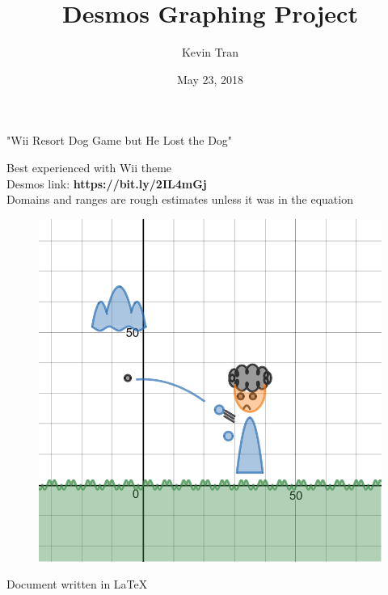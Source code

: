 \documentclass[12pt]{article}
\title{Desmos Graphing Project}
\author{Kevin Tran}
\date{May 23, 2018}
\begin{document}
\maketitle

\clearpage
\begin{center}
\begin{LARGE}
	"Wii Resort Dog Game but He Lost the Dog"\\
\end{LARGE}
	Best experienced with Wii theme\\
	\small Desmos link: \textbf{https://bit.ly/2IL4mGj}\\
	Domains and ranges are rough estimates unless it was in the equation\\
\end{center}

\begin{figure}[h]
	\begin{center}
		\includegraphics[scale=0.3]{graphproject}
	\end{center}	
\end{figure}

\begin{center}
	\small Document written in \LaTeX
\end{center}
\clearpage
\end{document}
